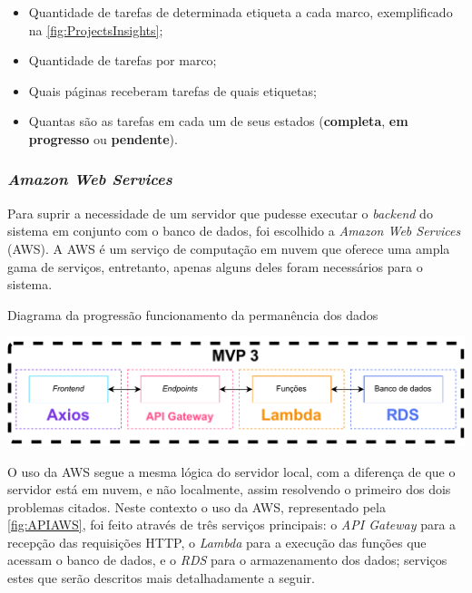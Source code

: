 \begin{itemize}
  \item Quantidade de tarefas de determinada etiqueta a cada marco, exemplificado na \autoref{fig:ProjectsInsights};
  \item Quantidade de tarefas por marco;
  \item Quais páginas receberam tarefas de quais etiquetas;
  \item Quantas são as tarefas em cada um de seus estados (\textbf{completa}, \textbf{em progresso} ou \textbf{pendente}).
\end{itemize}

\subsubsection*{\textit{Amazon Web Services}} \label{sssec:Amazon Web Services}

Para suprir a necessidade de um servidor que pudesse executar o \textit{backend} do sistema em conjunto com o banco de dados, foi escolhido a \textit{Amazon Web Services} (AWS). A AWS é um serviço de computação em nuvem que oferece uma ampla gama de serviços, entretanto, apenas alguns deles foram necessários para o sistema.

\begin{MyCenteredFigure} \caption{Diagrama da progressão funcionamento da permanência dos dados} \label{fig:API_MVP3}
  \includegraphics[width=\textwidth]{files/img/2.02!5-desenvolvimento/2.02!5.1.4-sistema/diagramas/API/API_MVP3}
\end{MyCenteredFigure}

O uso da AWS segue a mesma lógica do servidor local, com a diferença de que o servidor está em nuvem, e não localmente, assim resolvendo o primeiro dos dois problemas citados. Neste contexto o uso da AWS, representado pela \autoref{fig:APIAWS}, foi feito através de três serviços principais: o \textit{API Gateway} para a recepção das requisições HTTP, o \textit{Lambda} para a execução das funções que acessam o banco de dados, e o \textit{RDS} para o armazenamento dos dados; serviços estes que serão descritos mais detalhadamente a seguir.


